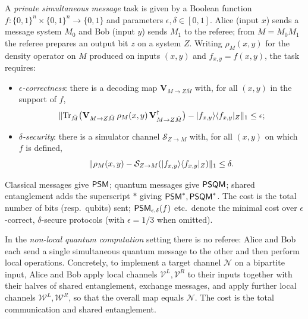 \begin{definition}
  \label{def:psm}
  A \emph{private simultaneous message} task is given by a Boolean function
  $f:\{0,1\}^n\times\{0,1\}^n\to\{0,1\}$ and parameters $\epsilon,\delta\in[0,1]$.
  Alice (input $x$) sends a message system $M_0$ and Bob (input $y$) sends $M_1$
  to the referee; from $M = M_0 M_1$ the referee prepares an output bit $z$ on a
  system $Z$. Writing $\rho_M(x,y)$ for the density operator on $M$ produced on
  inputs $(x,y)$ and $f_{x,y} = f(x,y)$, the task requires:
  \begin{itemize}
    \item \emph{$\epsilon$-correctness}: there is a decoding map
      $\mathbf{V}_{M\to Z\bar M}$ with, for all $(x,y)$ in the support of $f$,
      \[
        \lVert \operatorname{Tr}_{\bar M}\!\big(\mathbf{V}_{M\to Z\bar M}\,\rho_M(x,y)\,
          \mathbf{V}^\dagger_{M\to Z\bar M}\big) - \lvert f_{x,y}\rangle\langle f_{x,y}\rvert_Z \rVert_{1}
          \le \epsilon ;
      \]
    \item \emph{$\delta$-security}: there is a simulator channel
      $\mathcal{S}_{Z\to M}$ with, for all $(x,y)$ on which $f$ is defined,
      \[
        \lVert \rho_M(x,y) - \mathcal{S}_{Z\to M}
          (\lvert f_{x,y}\rangle\langle f_{x,y}\rvert_Z) \rVert_{1} \le \delta .
      \]
  \end{itemize}
  Classical messages give $\mathsf{PSM}$; quantum messages give $\mathsf{PSQM}$; shared
  entanglement adds the superscript $*$ giving $\mathsf{PSM}^{*}, \mathsf{PSQM}^{*}$. The cost is the
  total number of bits (resp.\ qubits) sent; $\mathsf{PSM}_{\epsilon,\delta}(f)$ etc.\
  denote the minimal cost over $\epsilon$-correct, $\delta$-secure protocols (with
  $\epsilon=1/3$ when omitted).
\end{definition}

\begin{definition}
  \label{def:nlqc}
  In the \emph{non-local quantum computation} setting there is no referee:
  Alice and Bob each send a single simultaneous quantum message to the other and
  then perform local operations. Concretely, to implement a target channel
  $\mathcal{N}$ on a bipartite input, Alice and Bob apply local channels
  $\mathcal{V}^L,\mathcal{V}^R$ to their inputs together with their halves of
  shared entanglement, exchange messages, and apply further local channels
  $\mathcal{W}^L,\mathcal{W}^R$, so that the overall map equals $\mathcal{N}$.
  The cost is the total communication and shared entanglement.
\end{definition}

